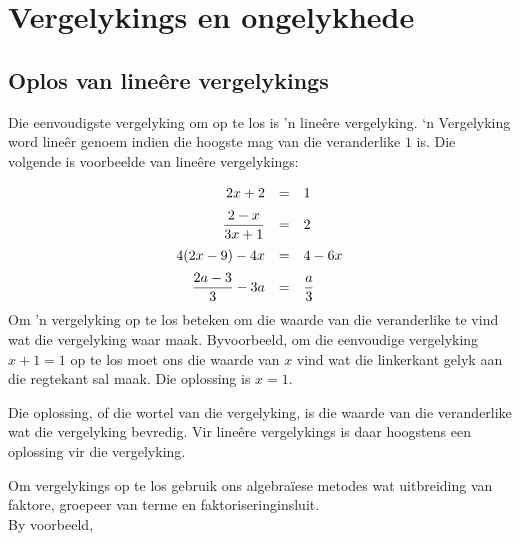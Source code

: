 \chapter{Vergelykings en ongelykhede}
\setcounter{figure}{1}
\setcounter{subfigure}{1}

\section{Oplos van lineêre vergelykings}
\nopagebreak

           
Die eenvoudigste vergelyking om op te los is ’n lineêre vergelyking. ‘n Vergelyking word lineêr genoem indien
die hoogste mag van die veranderlike $1$ is. Die volgende is voorbeelde van lineêre
vergelykings:\par 


\begin{equation*}
\begin{array}{ccl}\hfill 2x+2& =& 1\hfill \vspace{6pt} \\
 \hfill \dfrac{2-x}{3x+1}& =& 2\hfill \vspace{6pt} \\
\hfill 4(2x-9)-4x&=&4-6x \hfill  \vspace{6pt}\\ 
\hfill \dfrac{2a-3}{3}-3a&=&\dfrac{a}{3} \hfill\\
\end{array}
\end{equation*}
Om 'n vergelyking op te los beteken om die waarde van die veranderlike te vind wat die vergelyking waar maak. 
Byvoorbeeld, om die eenvoudige vergelyking $x+1=1$ op te los moet ons die waarde van $x$ vind wat die linkerkant gelyk aan die regtekant sal maak. Die oplossing is $x=1$.\par

Die oplossing, of die wortel van die vergelyking, is die waarde van die veranderlike wat die vergelyking bevredig. Vir lineêre vergelykings is daar 
 hoogstens een oplossing vir die vergelyking.\par
Om vergelykings op te los gebruik ons algebraïese metodes wat uitbreiding van faktore, groepeer van terme en faktoriseringinsluit.\\ 

By voorbeeld,

